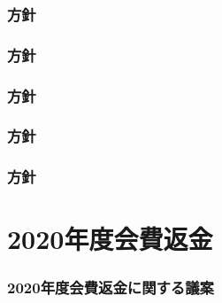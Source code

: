 \section{\kaikeiDepartment{}方針}

\section{\kensuiDepartment{}方針}

\section{\syogaiDepartment{}方針}

\section{\systemDepartment{}方針}

\section{\soumuDepartment{}方針}


\newpage
\part{2020年度会費返金}
\section{2020年度会費返金に関する議案}

